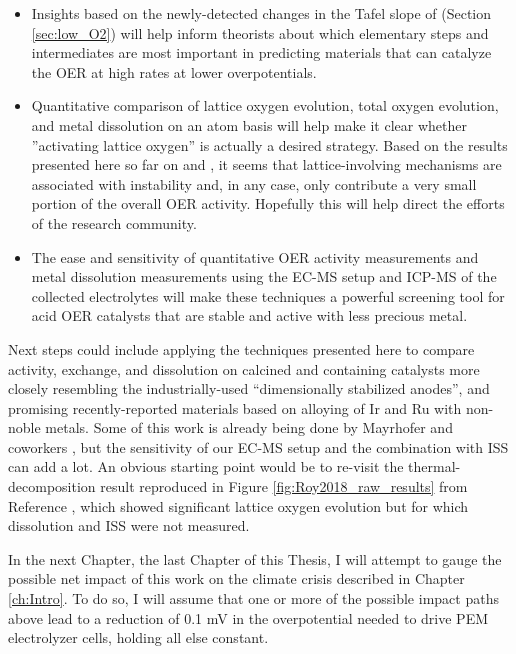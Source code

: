 \begin{itemize}
\item Insights based on the newly-detected changes in the Tafel slope of  (Section \ref{sec:low_O2}) will help inform theorists about which elementary steps and intermediates are most important in predicting materials that can catalyze the OER at high rates at lower overpotentials.

\item Quantitative comparison of lattice oxygen evolution, total oxygen evolution, and metal dissolution on an atom basis will help make it clear whether ''activating lattice oxygen'' is actually a desired strategy. Based on the results presented here so far on  and , it seems that lattice-involving mechanisms are associated with instability and, in any case, only contribute a very small portion of the overall OER activity. Hopefully this will help direct the efforts of the research community.

\item The ease and sensitivity of quantitative OER activity measurements and metal dissolution measurements using the EC-MS setup and ICP-MS of the collected electrolytes will make these techniques a powerful screening tool for acid OER catalysts that are stable and active with less precious metal.
\end{itemize}

Next steps could include applying the techniques presented here to compare activity, exchange, and dissolution on calcined  and  containing catalysts more closely resembling the industrially-used ``dimensionally stabilized anodes''\cite{Escudero-Escribano2018}, and promising recently-reported materials based on alloying of Ir and Ru with non-noble metals\cite{Reier2015a, Seitz2016, Diaz-Morales2016a}. Some of this work is already being done by Mayrhofer and coworkers \cite{Geiger2018}, but the sensitivity of our EC-MS setup and the combination with ISS can add a lot. An obvious starting point would be to re-visit the thermal-decomposition  result reproduced in Figure \ref{fig:Roy2018_raw_results} from Reference , which showed significant lattice oxygen evolution but for which dissolution and ISS were not measured. 

In the next Chapter, the last Chapter of this Thesis, I will attempt to gauge the possible net impact of this work on the climate crisis described in Chapter \ref{ch:Intro}. To do so, I will assume that one or more of the possible impact paths above lead to a reduction of 0.1 mV in the overpotential needed to drive PEM electrolyzer cells, holding all else constant.